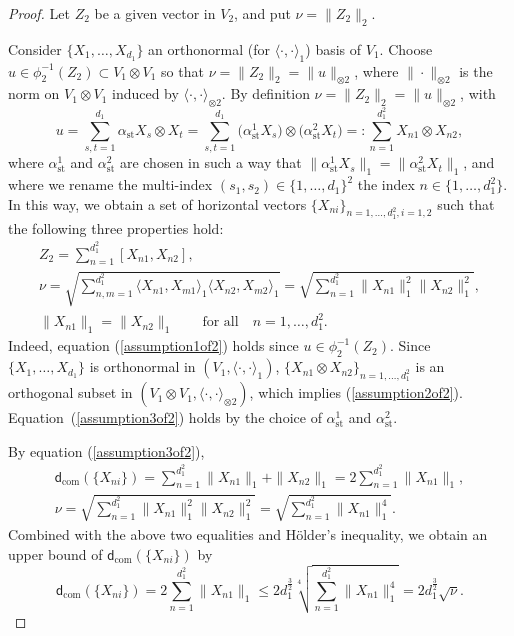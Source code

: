 \documentclass[10pt,a4paper]{amsart}
\numberwithin{equation}{section}
\begin{document}
\begin{proof}
Let $Z_2$ be a given vector in $V_2$,
and put $\nu=\|Z_2\|_2$.

 Consider $\{X_1,\dots,X_{d_1}\}$ an orthonormal (for $\langle\cdot,\cdot\rangle_1$) basis of $V_1$.
 Choose $u\in \phi_2^{-1}(Z_2)\subset V_1\otimes V_1$ so that $\nu=\|Z_2\|_2=\|u\|_{\otimes 2}$,
 where $\|\cdot\|_{\otimes 2}$ is the norm on $V_1\otimes V_1$ induced by $\langle\cdot,\cdot\rangle_{\otimes 2}$.
 By definition $\nu=\|Z_2\|_2=\|u\|_{\otimes 2}$,
 with
 \[
 u=\sum_{s,t=1}^{d_1}\alpha_{\mathrm{st}}X_s\otimes X_t=\sum_{s,t=1}^{d_1}\big(\alpha_{\mathrm{st}}^1X_s\big)\otimes\big(\alpha_{\mathrm{st}}^2 X_t\big)=:\sum_{n=1}^{d_1^2}X_{n1}\otimes X_{n2},
 \]
 where $\alpha_{\mathrm{st}}^1$ and $\alpha_{\mathrm{st}}^2$ are chosen in such a way that $\big\|\alpha_{\mathrm{st}}^1X_s\big\|_1=\big\|\alpha_{\mathrm{st}}^2X_t\big\|_1$,
 and where we rename the multi-index $(s_1,s_2)\in\{1,\dots,d_1\}^2$ the index $n\in\big\{1,\dots,d_1^2\big\}$.
 In this way, we obtain a set of horizontal vectors $\{X_{ni}\}_{n=1,\dots,d_1^2,i=1,2}$ such that the following three properties hold:
\begin{gather}
 Z_2=\sum_{n=1}^{d_1^2}[X_{n1},X_{n2}],\label{assumption1of2}
 \\
 \nu=\sqrt{\sum_{n,m=1}^{d_1^2}\langle X_{n1},X_{m1}\rangle_1\langle X_{n2},X_{m2}\rangle_1}=\sqrt{\sum_{n=1}^{d_1^2}\|X_{n1}\|_1^2\|X_{n2}\|_1^2},
 \label{assumption2of2}
 \\
\|X_{n1}\|_1=\|X_{n2}\|_1\qquad\text{for all} \quad n=1,\dots,d_1^2.\label{assumption3of2}
\end{gather}
Indeed,
equation (\ref{assumption1of2}) holds since $u\!\in\! \phi_2^{-1}(Z_2)$.
Since $\{X_1,\dots,X_{d_1}\}$ is orthonormal in $(V_1,\langle\cdot,\cdot\rangle_1)$,
$\{X_{n1}\otimes X_{n2}\}_{n=1,\dots,d_1^2}$ is an orthogonal subset in $(V_1\otimes V_1,\langle\cdot,\cdot\rangle_{\otimes 2})$,
which implies (\ref{assumption2of2}).
Equa\-tion~(\ref{assumption3of2}) holds by the choice of $\alpha_{\mathrm{st}}^1$ and $\alpha_{\mathrm{st}}^2$.

By equation (\ref{assumption3of2}),
\begin{gather*}
\mathsf{d}_{\mathrm{com}}(\{X_{ni}\})=\sum_{n=1}^{d_1^2}\|X_{n1}\|_1+\|X_{n2}\|_1 =2\sum_{n=1}^{d_1^2}\|X_{n1}\|_1,
\\
\nu=\sqrt{\sum_{n=1}^{d_1^2}\|X_{n1}\|_1^2\|X_{n2}\|_1^2}=\sqrt{\sum_{n=1}^{d_1^2}\|X_{n1}\|_1^4}.
\end{gather*}
Combined with the above two equalities and H\"older's inequality,
we obtain an upper bound of $\mathsf{d}_{\mathrm{com}}(\{X_{ni}\})$ by
\begin{equation}\label{eq2step2}
 \mathsf{d}_{\mathrm{com}}(\{X_{ni}\})= 2\sum_{n=1}^{d_1^2}\|X_{n1}\|_1\leq 2d_1^{\frac{3}{2}}\sqrt[4]{\sum_{n=1}^{d_1^2}\|X_{n1}\|_1^4}=2d_1^{\frac{3}{2}}\sqrt{\nu}.
\end{equation}


\end{proof}
\end{document}
